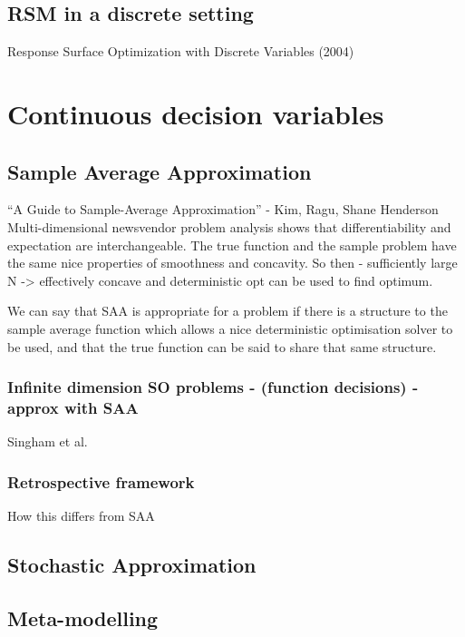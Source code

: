 \documentclass{article}
\begin{document}
\subsection{RSM in a discrete setting}

Response Surface Optimization with Discrete Variables (2004)

\section{Continuous decision variables}

\subsection{Sample Average Approximation}

``A Guide to Sample-Average Approximation'' - Kim, Ragu, Shane Henderson
Multi-dimensional newsvendor problem analysis shows that differentiability and expectation are interchangeable. The true function and the sample problem have the same nice properties of smoothness and concavity. So then - sufficiently large N -> effectively concave and deterministic opt can be used to find optimum.

We can say that SAA is appropriate for a problem if there is a structure to the sample average function which allows a nice deterministic optimisation solver to be used, and that the true function can be said to share that same structure.

\subsubsection{Infinite dimension SO problems - (function decisions) - approx with SAA}

Singham et al. 

\subsubsection{Retrospective framework}

How this differs from SAA

\subsection{Stochastic Approximation}

\subsection{Meta-modelling}
\end{document}
